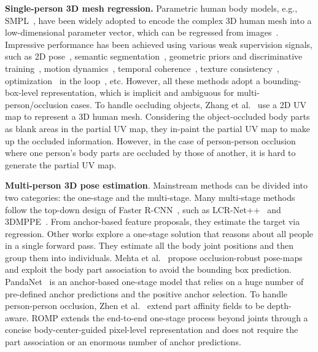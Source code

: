 \documentclass[10pt,twocolumn,letterpaper]{article}
\begin{document}
\textbf{Single-person 3D mesh regression.} 
Parametric human body models, e.g., SMPL~\cite{SMPL}, have been widely adopted to encode the complex 3D human mesh into a low-dimensional parameter vector, which can be regressed from images~\cite{liu2021recent}.
Impressive performance has been achieved using various weak supervision signals, such as 2D pose~\cite{choi2020pose2mesh,hmr,kundu2020appearance}, semantic segmentation~\cite{Xu_2019_ICCV}, 
geometric priors and discriminative training~\cite{hmr}, 
motion dynamics~\cite{kanazawa2019learning}, temporal coherence~\cite{kocabas2020vibe,sun2019dsd-satn}, texture consistency~\cite{pavlakos2019texturepose}, optimization~\cite{keep} in the loop~\cite{kolotouros2019spin}, etc.
However, all these methods adopt a bounding-box-level representation, which is implicit and ambiguous for multi-person/occlusion cases.
To handle occluding objects, Zhang et al.~\cite{zhang2020object} use a 2D UV map to represent a 3D human mesh. 
Considering the object-occluded body parts as blank areas in the partial UV map, they in-paint the partial UV map to make up the occluded information.
However, in the case of person-person occlusion where one person's body parts are occluded by those of another, it is hard to generate the partial UV map.

\textbf{Multi-person 3D pose estimation}. 
Mainstream methods can be divided into two categories: the one-stage and the multi-stage.
Many multi-stage methods follow the top-down design of Faster R-CNN~\cite{ren2015fasterrcnn}, such as LCR-Net++~\cite{rogez2019lcr} and 3DMPPE~\cite{moon2019camera}. 
From anchor-based feature proposals, they estimate the target via regression.
Other works explore a one-stage solution that reasons about all people in a single forward pass. They estimate all the body joint positions and then group them into individuals.
Mehta et al.~\cite{mehta2018single} propose  occlusion-robust pose-maps and exploit the body part association to avoid the bounding box prediction.
PandaNet~\cite{PandaNet_Benzine_2020_CVPR} is an anchor-based one-stage model that relies on a huge number of pre-defined anchor predictions and the positive anchor selection. 
To handle person-person occlusion, Zhen et al.~\cite{zhen2020smap} extend part affinity fields \cite{openpose} to be depth-aware.
ROMP extends the end-to-end one-stage process beyond joints through a concise body-center-guided pixel-level representation and does not require the part association or an enormous number of anchor predictions.
\end{document}
